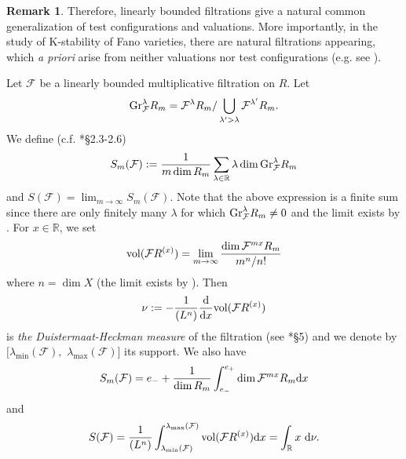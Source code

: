 \documentclass[12pt,reqno]{amsart}%
\newcommand{\bR}{{\mathbb{R} }}
\newcommand{\rd}{\mathrm{d}}
\newcommand{\cF}{\mathcal{F}}
\theoremstyle{definition}
\newtheorem{rem}[thm]{Remark}
\theoremstyle{remark}
\newcommand{\vol}{{\rm vol}}
\newcommand{\Gr}{{\rm Gr}}
\begin{document}
\begin{rem}
Therefore, linearly bounded filtrations give a natural common generalization of test configurations and valuations.  More importantly, in the study of K-stability of Fano varieties, there are natural filtrations appearing, which {\it a priori} arise from neither valuations nor test configurations (e.g. see \cite{BX19, XZ19}). 
\end{rem}


Let $\cF$ be a linearly bounded multiplicative filtration on $R$. Let 
$$\Gr^\lambda_\cF R_m = \cF^\lambda R_m / \bigcup_{\lambda'>\lambda} \cF^{\lambda'} R_m.$$
We define (c.f. \cite{BJ20}*{\S 2.3-2.6})
\[
S_m(\cF):=\frac{1}{m\dim R_m}\sum_{\lambda\in\bR} \lambda \dim\Gr^\lambda_\cF R_m
\]
and $S(\cF)=\lim_{m\to \infty} S_m(\cF)$. Note that the above expression is a finite sum since there are only finitely many $\lambda$ for which $\Gr^\lambda_\cF R_m\neq 0$ and the limit exists by \cite{BC11}. For $x\in \bR$, we set
\[
\vol(\cF R^{(x)})=\lim_{m\to \infty} \frac{\dim \cF^{mx}R_m}{m^n/n!}
\]
where $n=\dim X$ (the limit exists by \cite{LM09}). Then 
$$\nu:=-\frac{1}{(L^n)}\frac{\rd}{\rd x}\vol(\cF R^{(x)})$$ is {\it the Duistermaat-Heckman measure} of the filtration (see \cite{BHJ17}*{\S 5}) and we denote by $[\lambda_{\min}(\cF),$ $\lambda_{\max}(\cF)]$ its support. We also have 
\[
S_m(\cF) = e_- + \frac{1}{\dim R_m}\int_{e_-}^{e_+} \dim \cF^{mx}R_m {\rm d}x
\]
and
\[
S(\cF) = \frac{1}{(L^n)} \int_{\lambda_{\min}(\cF)}^{\lambda_{\max}(\cF)} \vol(\cF R^{(x)}) {\rm d}x = \int_{\bR} x\ \rd \nu.
\]
\end{document}
